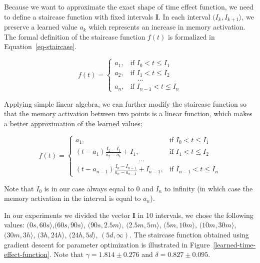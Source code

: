 Because we want to approximate the exact shape of time effect function, we need to define a staircase function with fixed intervals $\boldsymbol{I}$. In each interval $(I_k, I_{k+1}\rangle$, we preserve a learned value $a_k$ which represents an increase in memory activation. The formal definition of the staircase function $f(t)$ is formalized in Equation~\ref{eq-staircase}.

\begin{equation} \label{eq-staircase}
  f(t) = \begin{cases}
            a_1, & \text{if } I_0 < t \leq I_1 \\
            a_2, & \text{if } I_1 < t \leq I_2 \\
                 & \hspace{1em} \dots \\
            a_n, & \text{if } I_{n-1} < t \leq I_n
         \end{cases}
\end{equation}

Applying simple linear algebra, we can further modify the staircase function so that the memory activation between two points is a linear function, which makes a better approximation of the learned values:

\begin{equation} \label{eq-staircase-2}
  f(t) = \begin{cases}
            a_1, & \text{if } I_0 < t \leq I_1 \\
            (t - a_1) \frac{I_2 - I_1}{a_2 - a_1} + I_1, & \text{if } I_1 < t \leq I_2 \\
            \hspace{9em} \dots \\
            (t - a_{n-1}) \frac{I_n - I_{n-1}}{a_n - a_{n-1}} + I_{n-1}, & \text{if } I_{n-1} < t \leq I_n     
         \end{cases}
\end{equation}

Note that $I_0$ is in our case always equal to $0$ and $I_n$ to infinity (in which case the memory activation in the interval is equal to $a_n$).

In our experiments we divided the vector $\boldsymbol{I}$ in 10 intervals, we chose the following values: $(0s, 60s\rangle$,$(60s, 90s\rangle$, $(90s, 2.5m\rangle$, $(2.5m, 5m\rangle$, $(5m, 10m\rangle$, $(10m, 30m\rangle$, $(30m, 3h\rangle$, $(3h, 24h\rangle$, $(24h, 5d\rangle$, $(5d, \infty)$. The staircase function obtained using gradient descent for parameter optimization is illustrated in Figure~\ref{learned-time-effect-function}. Note that $\gamma = 1.814 \pm 0.276$ and $\delta = 0.827 \pm 0.095$.

